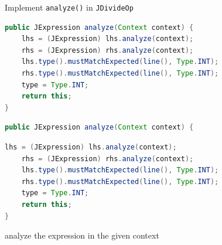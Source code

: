 \documentclass[8pt,a4paper,compress]{beamer}
\begin{document}
\begin{frame}[fragile]
\pause

Implement \lstinline{analyze()} in \lstinline{JDivideOp}

\smallskip

\begin{overprint}
\begin{tcolorbox}[enhanced,drop shadow southwest,sharp corners,size=fbox,colback=white,fontlower=\small\ttfamily,collower=silver900]

\begin{lstlisting}[language=Java,style=focusin]
public JExpression analyze(Context context) {
    lhs = (JExpression) lhs.analyze(context);
    rhs = (JExpression) rhs.analyze(context);
    lhs.type().mustMatchExpected(line(), Type.INT);
    rhs.type().mustMatchExpected(line(), Type.INT);
    type = Type.INT;
    return this;
}
\end{lstlisting}

\tcblower
\begin{minipage}[t][.2cm][t]{\textwidth}

\end{minipage}
\end{tcolorbox}

\begin{tcolorbox}[enhanced,drop shadow southwest,sharp corners,size=fbox,colback=white,fontlower=\small\ttfamily,collower=silver900]

\begin{lstlisting}[language=Java,style=focusin,backgroundcolor=\color{lime100}]
public JExpression analyze(Context context) {
\end{lstlisting}
\begin{lstlisting}[language=Java,style=focusout]
    lhs = (JExpression) lhs.analyze(context);
    rhs = (JExpression) rhs.analyze(context);
    lhs.type().mustMatchExpected(line(), Type.INT);
    rhs.type().mustMatchExpected(line(), Type.INT);
    type = Type.INT;
    return this;
}
\end{lstlisting}

\tcblower
\begin{minipage}[t][.2cm][t]{\textwidth}
analyze the expression in the given context
\end{minipage}
\end{tcolorbox}

\begin{tcolorbox}[enhanced,drop shadow southwest,sharp corners,size=fbox,colback=white,fontlower=\small\ttfamily,collower=silver900]


\end{tcolorbox}
\end{overprint}
\end{frame}
\end{document}

